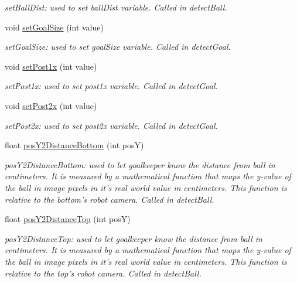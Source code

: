 \begin{DoxyCompactItemize}
\begin{DoxyCompactList}\small\item\em set\-Ball\-Dist\-: used to set ball\-Dist variable. Called in detect\-Ball. \end{DoxyCompactList}\item 
void \hyperlink{classVS_adde8213a7167ea6ce8632a3281d7f178}{set\-Goal\-Size} (int value)
\begin{DoxyCompactList}\small\item\em set\-Goal\-Size\-: used to set goal\-Size variable. Called in detect\-Goal. \end{DoxyCompactList}\item 
void \hyperlink{classVS_afa51a242306b4f0c08e20ad8c4ee3002}{set\-Post1x} (int value)
\begin{DoxyCompactList}\small\item\em set\-Post1x\-: used to set post1x variable. Called in detect\-Goal. \end{DoxyCompactList}\item 
void \hyperlink{classVS_a705ae497e632116f90c6d7cd23f94896}{set\-Post2x} (int value)
\begin{DoxyCompactList}\small\item\em set\-Post2x\-: used to set post2x variable. Called in detect\-Goal. \end{DoxyCompactList}\item 
float \hyperlink{classVS_a2436addae0923c419c900743310ab4bd}{pos\-Y2\-Distance\-Bottom} (int pos\-Y)
\begin{DoxyCompactList}\small\item\em pos\-Y2\-Distance\-Bottom\-: used to let goalkeeper know the distance from ball in centimeters. It is measured by a mathematical function that maps the y-\/value of the ball in image pixels in it's real world value in centimeters. This function is relative to the bottom's robot camera. Called in detect\-Ball. \end{DoxyCompactList}\item 
float \hyperlink{classVS_aff98c9a04df0e72e4be252321928e953}{pos\-Y2\-Distance\-Top} (int pos\-Y)
\begin{DoxyCompactList}\small\item\em pos\-Y2\-Distance\-Top\-: used to let goalkeeper know the distance from ball in centimeters. It is measured by a mathematical function that maps the y-\/value of the ball in image pixels in it's real world value in centimeters. This function is relative to the top's robot camera. Called in detect\-Ball. \end{DoxyCompactList}\item 

\end{DoxyCompactItemize}
